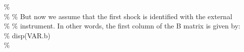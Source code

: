 \hspace{1mm}\hspace{5mm} \hspace{5mm} \hspace{5mm} \hspace{5mm} \hspace{5mm} \hspace{5mm} \hspace{5mm} \textcolor{matlabgreen}{\%  }\\ 
\hspace{1mm}\hspace{5mm} \hspace{5mm} \hspace{5mm} \hspace{5mm} \hspace{5mm} \hspace{5mm} \hspace{5mm} \textcolor{matlabgreen}{\% }\textcolor{matlabgreen}{\% But now we assume that the first shock is identified with the external  }\\ 
\hspace{1mm}\hspace{5mm} \hspace{5mm} \hspace{5mm} \hspace{5mm} \hspace{5mm} \hspace{5mm} \hspace{5mm} \textcolor{matlabgreen}{\% }\textcolor{matlabgreen}{\% instrument. In other words, the first column of the B matrix is given by: }\\ 
\hspace{1mm}\hspace{5mm} \hspace{5mm} \hspace{5mm} \hspace{5mm} \hspace{5mm} \hspace{5mm} \hspace{5mm} \textcolor{matlabgreen}{\% disp(VAR.b) }\\ 
\hspace{1mm}\hspace{5mm} \hspace{5mm} \hspace{5mm} \hspace{5mm} \hspace{5mm} \hspace{5mm} \hspace{5mm} \textcolor{matlabgreen}{\%  }\\ 
